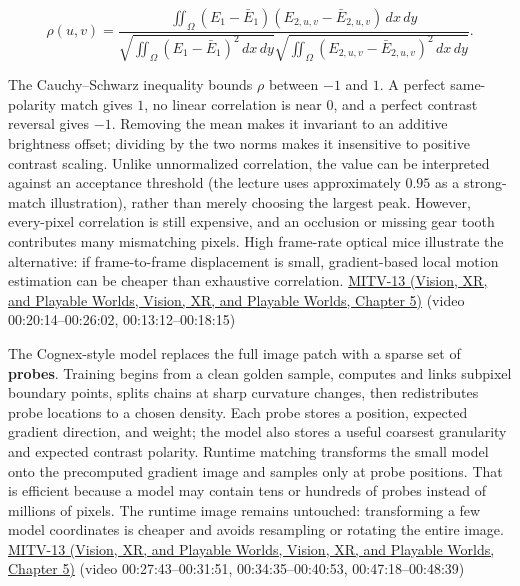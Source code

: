 \[
\rho(u,v)=\frac{\iint_\Omega (E_1-\bar E_1)(E_{2,u,v}-\bar E_{2,u,v})\,dx\,dy}{\sqrt{\iint_\Omega(E_1-\bar E_1)^2\,dx\,dy}\sqrt{\iint_\Omega(E_{2,u,v}-\bar E_{2,u,v})^2\,dx\,dy}}.
\]

The Cauchy--Schwarz inequality bounds \(\rho\) between \(-1\) and \(1\). A perfect same-polarity match gives \(1\), no linear correlation is near \(0\), and a perfect contrast reversal gives \(-1\). Removing the mean makes it invariant to an additive brightness offset; dividing by the two norms makes it insensitive to positive contrast scaling. Unlike unnormalized correlation, the value can be interpreted against an acceptance threshold (the lecture uses approximately \(0.95\) as a strong-match illustration), rather than merely choosing the largest peak. However, every-pixel correlation is still expensive, and an occlusion or missing gear tooth contributes many mismatching pixels. High frame-rate optical mice illustrate the alternative: if frame-to-frame displacement is small, gradient-based local motion estimation can be cheaper than exhaustive correlation. \href{../07-Vision-XR-and-Playable-Worlds/main.pdf\#nameddest=04-visual-computing-ii-ch036-mitv-13---object-detection-recognition-and-pose-determination-patquick-us-7016539}{MITV-13 (Vision, XR, and Playable Worlds, Vision, XR, and Playable Worlds, Chapter 5)} (video 00:20:14--00:26:02, 00:13:12--00:18:15)

The Cognex-style model replaces the full image patch with a sparse set of \textbf{probes}. Training begins from a clean golden sample, computes and links subpixel boundary points, splits chains at sharp curvature changes, then redistributes probe locations to a chosen density. Each probe stores a position, expected gradient direction, and weight; the model also stores a useful coarsest granularity and expected contrast polarity. Runtime matching transforms the small model onto the precomputed gradient image and samples only at probe positions. That is efficient because a model may contain tens or hundreds of probes instead of millions of pixels. The runtime image remains untouched: transforming a few model coordinates is cheaper and avoids resampling or rotating the entire image. \href{../07-Vision-XR-and-Playable-Worlds/main.pdf\#nameddest=04-visual-computing-ii-ch036-mitv-13---object-detection-recognition-and-pose-determination-patquick-us-7016539}{MITV-13 (Vision, XR, and Playable Worlds, Vision, XR, and Playable Worlds, Chapter 5)} (video 00:27:43--00:31:51, 00:34:35--00:40:53, 00:47:18--00:48:39)

